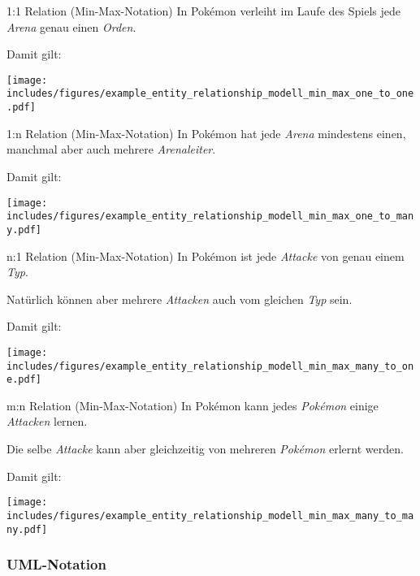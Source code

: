 \newpage

\begin{example}{1:1 Relation (Min-Max-Notation)}
    In Pokémon verleiht im Laufe des Spiels jede \emph{Arena} genau einen \emph{Orden}.

    Damit gilt:
    \begin{center}
        \texttt{[image: includes/figures/example\_entity\_relationship\_modell\_min\_max\_one\_to\_one.pdf]}
    \end{center}
\end{example}

\begin{example}{1:n Relation (Min-Max-Notation)}
    In Pokémon hat jede \emph{Arena} mindestens einen, manchmal aber auch mehrere \emph{Arenaleiter}.

    Damit gilt:
    \begin{center}
        \texttt{[image: includes/figures/example\_entity\_relationship\_modell\_min\_max\_one\_to\_many.pdf]}
    \end{center}
\end{example}

\begin{example}{n:1 Relation (Min-Max-Notation)}
    In Pokémon ist jede \emph{Attacke} von genau einem \emph{Typ}.

    Natürlich können aber mehrere \emph{Attacken} auch vom gleichen \emph{Typ} sein.

    Damit gilt:
    \begin{center}
        \texttt{[image: includes/figures/example\_entity\_relationship\_modell\_min\_max\_many\_to\_one.pdf]}
    \end{center}
\end{example}

\begin{example}{m:n Relation (Min-Max-Notation)}
    In Pokémon kann jedes \emph{Pokémon} einige \emph{Attacken} lernen.

    Die selbe \emph{Attacke} kann aber gleichzeitig von mehreren \emph{Pokémon} erlernt werden.

    Damit gilt:
    \begin{center}
        \texttt{[image: includes/figures/example\_entity\_relationship\_modell\_min\_max\_many\_to\_many.pdf]}
    \end{center}
\end{example}

\newpage
\subsubsection{UML-Notation}

